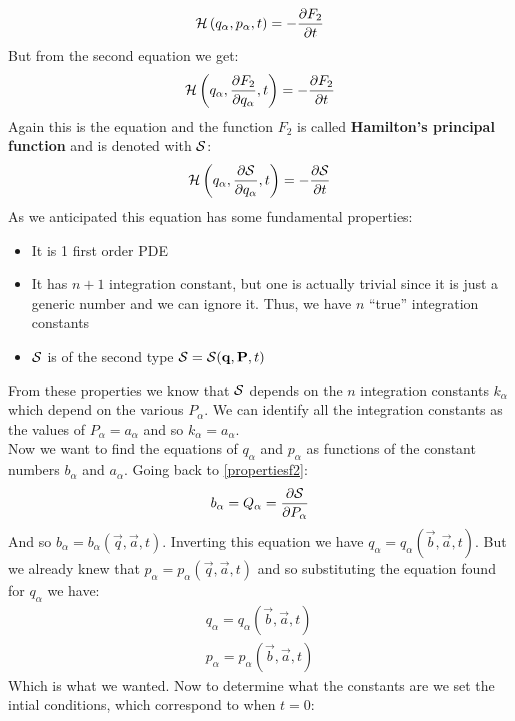 \begin{equation}
  \hamfun \brackets{q_{\alpha}, p_{\alpha},t}= -\pdv{F_2}{t}
\end{equation}
But from the second equation we get:
\begin{equation}
  \hamfun \brackets{q_{\alpha}, \pdv{F_2}{q_{\alpha}},t}= -\pdv{F_2}{t}
\end{equation}
Again this is the \hamjacref\;equation and the function $F_2$ is called \textbf{Hamilton's principal function} and is denoted with $\mathcal{S}$:
\begin{equation}
  \hamfun \brackets{q_{\alpha}, \pdv{\action}{q_{\alpha}},t}= -\pdv{\action}{t}
\end{equation}
As we anticipated this equation has some fundamental properties:
\begin{itemize}
  \item It is 1 first order PDE
  \item It has $n+1$ integration constant, but one is actually trivial since it is just a generic number and we can ignore it. Thus, we have $n$ ``true'' integration constants
  \item $\mathcal{S}$ is of the second type $\mathcal{S} = \mathcal{S}(\vb{q},\vb{P},t)$
\end{itemize}
From these properties we know that $\mathcal{S}$ depends on the $n$ integration constants $k_{\alpha}$ which depend on the various $P_{\alpha}$. We can identify all the integration constants as the values of $P_{\alpha} = a_{\alpha}$ and so $k_{\alpha} = a_{\alpha}$.\\
Now we want to find the equations of $q_{\alpha}$ and $p_{\alpha}$ as functions of the constant numbers $b_{\alpha}$ and $a_{\alpha}$. Going back to \eqref{propertiesf2}:
\begin{equation}
  b_{\alpha} = Q_{\alpha} = \pdv{\action}{P_{\alpha}}
\end{equation}
And so $b_{\alpha} = b_{\alpha}(\vec{q},\vec{a},t)$. Inverting this equation we have $q_{\alpha} = q_{\alpha}(\vec{b},\vec{a},t)$. But we already knew that $p_{\alpha} = p_{\alpha}(\vec{q},\vec{a},t)$ and so substituting the equation found for $q_{\alpha}$ we have:
\begin{equation}
  \begin{split}
    q_{\alpha} = q_{\alpha}(\vec{b},\vec{a},t)\\[8pt]
    p_{\alpha} = p_{\alpha}(\vec{b},\vec{a},t)
  \end{split}
\end{equation}
Which is what we wanted. Now to determine what the constants are we set the intial conditions, which correspond to when $t=0$:
